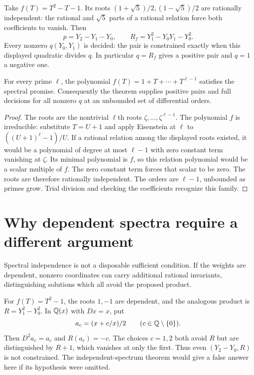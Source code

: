 \documentclass[11pt]{article}
\begin{document}
\begin{example}
Take $f(T)=T^2-T-1$. Its roots
$(1+\sqrt5)/2,(1-\sqrt5)/2$ are rationally independent: the rational
and $\sqrt5$ parts of a rational relation force both coefficients
to vanish. Then
\[
 p=Y_2-Y_1-Y_0,\qquad
 R_f=Y_1^2-Y_0Y_1-Y_0^2.
\]
Every nonzero $q(Y_0,Y_1)$ is decided: the pair is constrained
exactly when this displayed quadratic divides $q$. In particular
$q=R_f$ gives a positive pair and $q=1$ a negative one.
\end{example}

\begin{proposition}\label{prop:cyclotomic}
For every prime $\ell$, the polynomial
$f(T)=1+T+\cdots+T^{\ell-1}$ satisfies the spectral promise.
Consequently the theorem supplies positive pairs and full decisions
for all nonzero $q$ at an unbounded set of differential orders.
\end{proposition}
\begin{proof}
The roots are the nontrivial $\ell$th roots
$\zeta,\ldots,\zeta^{\ell-1}$. The polynomial $f$ is irreducible:
substitute $T=U+1$ and apply Eisenstein at $\ell$ to
$((U+1)^\ell-1)/U$. If a rational relation among the displayed
roots existed, it would be a polynomial of degree at most
$\ell-1$ with zero constant term vanishing at $\zeta$.
Its minimal polynomial is $f$, so this relation polynomial would
be a scalar multiple of $f$. The zero constant term forces that
scalar to be zero. The roots are therefore rationally independent.
The orders are $\ell-1$, unbounded as primes grow. Trial division
and checking the coefficients recognize this family.
\end{proof}

\section{Why dependent spectra require a different argument}

Spectral independence is not a disposable sufficient condition.
If the weights are dependent, nonzero coordinates can carry
additional rational invariants, distinguishing solutions which
all avoid the proposed product.

For $f(T)=T^2-1$, the roots $1,-1$ are dependent, and the analogous
product is $R=Y_1^2-Y_0^2$. In $\mathbb Q(x)$ with $Dx=x$, put
\[
 a_c=(x+c/x)/2\qquad(c\in\mathbb Q\setminus\{0\}).
\]
Then $D^2a_c=a_c$ and $R(a_c)=-c$. The choices $c=1,2$ both
avoid $R$ but are distinguished by $R+1$, which vanishes at only
the first. Thus even $(Y_2-Y_0,R)$ is not constrained. The
independent-spectrum theorem would give a false answer here
if its hypothesis were omitted.
\end{document}
